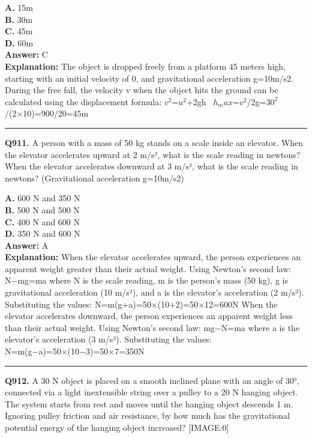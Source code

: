 \documentclass[12pt]{article}
\begin{document}
\textbf{A.} 15m \\
\textbf{B.} 30m \\
\textbf{C.} 45m \\
\textbf{D.} 60m \\

\textbf{Answer:} C \\
\textbf{Explanation:} The object is dropped freely from a platform 45 meters high, starting with an initial velocity of 0, and gravitational acceleration g=10m/s2.
During the free fall, the velocity v when the object hits the ground can be calculated using the displacement formula: $v^2$=$u^2$+2gh  $h_max$=$v^2$/2g=$30^2$/(2×10)=900/20=45m

\hrule
\vspace{1em}


\noindent
\textbf{Q911.} A person with a mass of 50 kg stands on a scale inside an elevator. When the elevator accelerates upward at 2 m/s², what is the scale reading in newtons? When the elevator accelerates downward at 3 m/s², what is the scale reading in newtons? (Gravitational acceleration g=10m/s2)



\textbf{A.} 600 N and 350 N \\
\textbf{B.} 500 N and 500 N \\
\textbf{C.} 400 N and 600 N \\
\textbf{D.} 350 N and 600 N \\

\textbf{Answer:} A \\
\textbf{Explanation:} When the elevator accelerates upward, the person experiences an apparent weight greater than their actual weight. Using Newton's second law:
N−mg=ma
where N is the scale reading, m is the person's mass (50 kg), g is gravitational acceleration (10 m/s²), and a is the elevator's acceleration (2 m/s²).
Substituting the values:
N=m(g+a)=50×(10+2)=50×12=600N
When the elevator accelerates downward, the person experiences an apparent weight less than their actual weight. Using Newton's second law:
mg−N=ma
where a is the elevator's acceleration (3 m/s²).
Substituting the values:
N=m(g−a)=50×(10−3)=50×7=350N

\hrule
\vspace{1em}


\noindent
\textbf{Q912.} A 30 N object is placed on a smooth inclined plane with an angle of 30°, connected via a light inextensible string over a pulley to a 20 N hanging object. The system starts from rest and moves until the hanging object descends 1 m. Ignoring pulley friction and air resistance, by how much has the gravitational potential energy of the hanging object increased?
[IMAGE:0]
\end{document}
